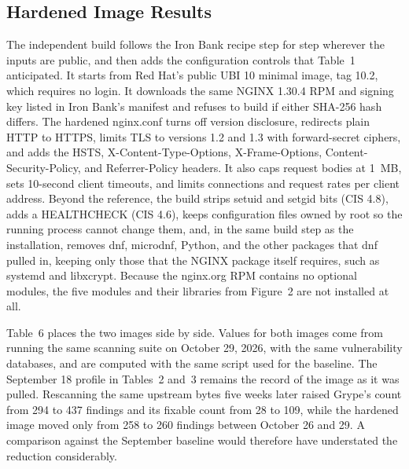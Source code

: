 \documentclass[10pt,letterpaper,twocolumn]{article}
\begin{document}
\subsection{Hardened Image Results}

The independent build follows the Iron Bank recipe step for step wherever the inputs are public, and then adds the configuration controls that Table~1 anticipated. It starts from Red Hat's public UBI 10 minimal image, tag 10.2, which requires no login. It downloads the same NGINX 1.30.4 RPM and signing key listed in Iron Bank's manifest and refuses to build if either SHA-256 hash differs. The hardened nginx.conf turns off version disclosure, redirects plain HTTP to HTTPS, limits TLS to versions 1.2 and 1.3 with forward-secret ciphers, and adds the HSTS, X-Content-Type-Options, X-Frame-Options, Content-Security-Policy, and Referrer-Policy headers. It also caps request bodies at 1~MB, sets 10-second client timeouts, and limits connections and request rates per client address. Beyond the reference, the build strips setuid and setgid bits (CIS 4.8), adds a HEALTHCHECK (CIS 4.6), keeps configuration files owned by root so the running process cannot change them, and, in the same build step as the installation, removes dnf, microdnf, Python, and the other packages that dnf pulled in, keeping only those that the NGINX package itself requires, such as systemd and libxcrypt. Because the nginx.org RPM contains no optional modules, the five modules and their libraries from Figure~2 are not installed at all.

Table~6 places the two images side by side. Values for both images come from running the same scanning suite on October 29, 2026, with the same vulnerability databases, and are computed with the same script used for the baseline. The September 18 profile in Tables~2 and~3 remains the record of the image as it was pulled. Rescanning the same upstream bytes five weeks later raised Grype's count from 294 to 437 findings and its fixable count from 28 to 109, while the hardened image moved only from 258 to 260 findings between October 26 and 29. A comparison against the September baseline would therefore have understated the reduction considerably.
\end{document}
